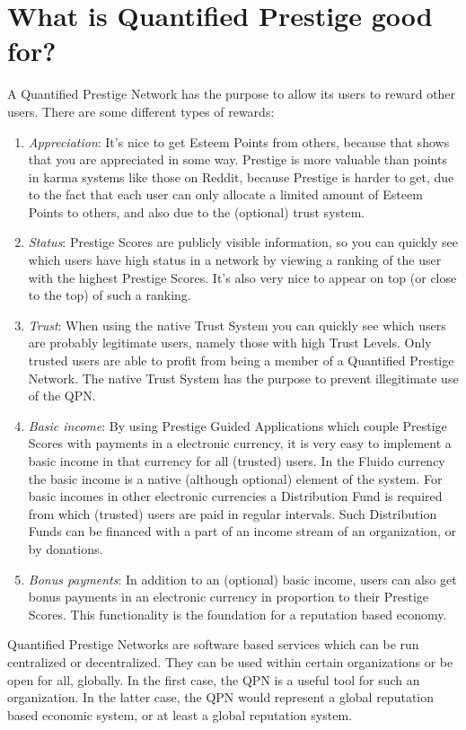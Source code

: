 \documentclass[a4paper,12pt]{scrartcl}
\begin{document}
\part{What is Quantified Prestige good for?}
A Quantified Prestige Network has the purpose to allow its users to reward other users. There are some different types of rewards:

\begin{enumerate}
 \item \textit{Appreciation}: It's nice to get Esteem Points from others, because that shows that you are appreciated in some way. Prestige is more valuable than points in karma systems like those on Reddit, because Prestige is harder to get, due to the fact that each user can only allocate a limited amount of Esteem Points to others, and also due to the (optional) trust system.
 \item \textit{Status}: Prestige Scores are publicly visible information, so you can quickly see which users have high status in a network by viewing a ranking of the user with the highest Prestige Scores. It's also very nice to appear on top (or close to the top) of such a ranking.
 \item \textit{Trust}: When using the native Trust System you can quickly see which users are probably legitimate users, namely those with high Trust Levels. Only trusted users are able to profit from being a member of a Quantified Prestige Network. The native Trust System has the purpose to prevent illegitimate use of the QPN.
 \item \textit{Basic income}: By using Prestige Guided Applications which couple Prestige Scores with payments in a electronic currency, it is very easy to implement a basic income in that currency for all (trusted) users. In the Fluido currency the basic income is a native (although optional) element of the system. For basic incomes in other electronic currencies a Distribution Fund is required from which (trusted) users are paid in regular intervals. Such Distribution Funds can be financed with a part of an income stream of an organization, or by donations.
 \item \textit{Bonus payments}: In addition to an (optional) basic income, users can also get bonus payments in an electronic currency in proportion to their Prestige Scores. This functionality is the foundation for a reputation based economy.
\end{enumerate}

Quantified Prestige Networks are software based services which can be run centralized or decentralized. They can be used within certain organizations or be open for all, globally. In the first case, the QPN is a useful tool for such an organization. In the latter case, the QPN would represent a global reputation based economic system, or at least a global reputation system. 
\end{document}
